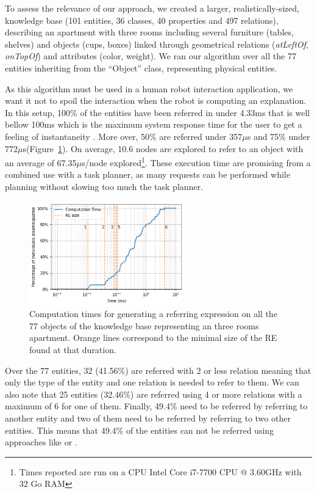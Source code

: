 \documentclass[a4paper,11pt,twoside]{StyleThese}
\begin{document}
To assess the relevance of our approach, we created a larger, realistically-sized, knowledge base (101 entities, 36 classes, 40 properties and 497 relations), describing an apartment with three rooms including several furniture (tables, shelves) and objects (cups, boxes) linked through geometrical relations (\textit{atLeftOf}, \textit{onTopOf}) and attributes (color, weight).
We ran our algorithm over all the 77 entities inheriting from the ``Object'' class, representing physical entities. 

\newcommand{\us}{$\mu$s\xspace}

As this algorithm must be used in a human robot interaction application, we want it not to spoil the interaction when the robot is computing an explanation. In this setup, 100\% of the entities have been referred in under 4.33ms that is well bellow 100ms which is the maximum system response time for the user to get a feeling of instantaneity \cite{miller1968response}. More over, 50\% are referred under 357\us and 75\% under 772\us (Figure~\ref{fig:scalingup}). On average, 10.6 nodes are explored to refer to an object with an average of 67.35\us/node explored\footnote{Times reported are run on a CPU Intel Core i7-7700 CPU @ 3.60GHz with 32 Go RAM}. These execution time are promising from a combined use with a task planner, as many requests can be performed while planning without slowing too much the task planner.

\begin{figure}[hbtp]
\centering
\includegraphics[width=0.6\textwidth]{figures/chapter3/scalingupREG.png}
\caption{Computation times for generating a referring expression on all the 77 objects of the knowledge base representing an three rooms apartment. Orange lines correspond to the minimal size of the RE found at that duration.}
\label{fig:scalingup}
\end{figure}

Over the 77 entities, 32 (41.56\%) are referred with 2 or less relation meaning that only the type of the entity and one relation is needed to refer to them. We can also note that 25 entities (32.46\%) are referred using 4 or more relations with a maximum of 6 for one of them. Finally, 49.4\% need to be referred by referring to another entity and two of them need to be referred by referring to two other entities. This means that 49.4\% of the entities can not be referred using approaches like \cite{ros2010one} or \cite{dale1995computational}.
\end{document}
